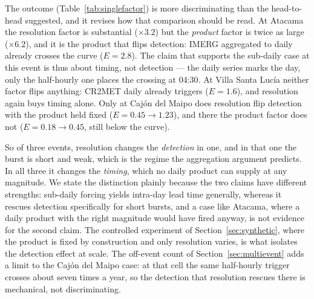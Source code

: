 \documentclass[authoryear,preprint,review,12pt]{elsarticle}
\begin{document}
The outcome (Table~\ref{tab:singlefactor}) is more discriminating than the
head-to-head suggested, and it revises how that comparison should be read. At
Atacama the resolution factor is substantial ($\times3.2$) but the \emph{product}
factor is twice as large ($\times6.2$), and it is the product that flips detection:
IMERG aggregated to daily already crosses the curve ($E=2.8$). The claim that
supports the sub-daily case at this event is thus about timing, not detection ---
the daily series marks the day, only the half-hourly one places the crossing at
04:30. At Villa Santa Luc\'ia neither factor flips anything: CR2MET daily already
triggers ($E=1.6$), and resolution again buys timing alone. Only at Caj\'on del
Maipo does resolution flip detection with the product held fixed
($E=0.45\to1.23$), and there the product factor does not ($E=0.18\to0.45$, still
below the curve).

So of three events, resolution changes the \emph{detection} in one, and in that one the burst is short and weak, which is the regime the aggregation argument predicts. In all three it changes the \emph{timing}, which no daily product can
supply at any magnitude. We state the distinction plainly because the two claims
have different strengths: sub-daily forcing yields intra-day lead time generally,
whereas it rescues detection specifically for short bursts, and a case like
Atacama, where a daily product with the right magnitude would have fired anyway, is
not evidence for the second claim. The controlled experiment of
Section~\ref{sec:synthetic}, where the product is fixed by construction and only
resolution varies, is what isolates the detection effect at scale. The off-event
count of Section~\ref{sec:multievent} adds a limit to the Caj\'on del Maipo case: at
that cell the same half-hourly trigger crosses about seven times a year, so the
detection that resolution rescues there is mechanical, not discriminating.
\end{document}
